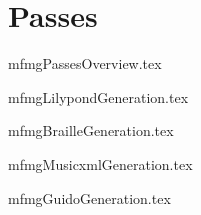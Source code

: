



\part{Passes}

{mfmgPassesOverview.tex}

{mfmgLilypondGeneration.tex}

{mfmgBrailleGeneration.tex}

{mfmgMusicxmlGeneration.tex}

{mfmgGuidoGeneration.tex}

